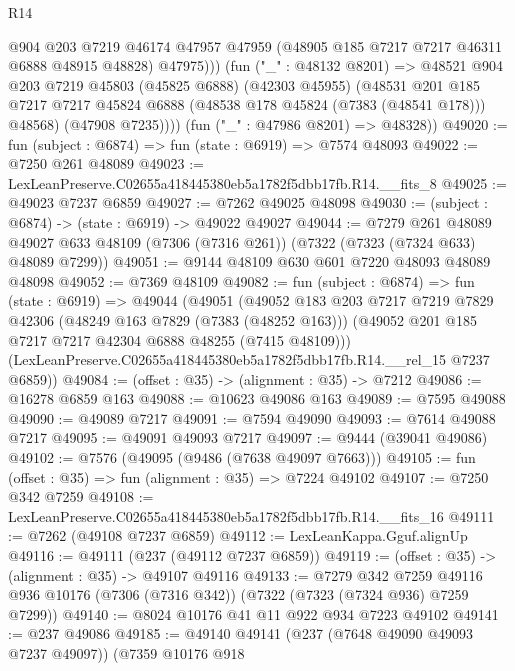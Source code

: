 \begin{lexlean}{R14}
\begin{coremodule}
                @904
                @203
                @7219
                @46174
                @47957
                @47959
                (@48905 @185 @7217 @7217 @46311 @6888 @48915 @48828)
                @47975)))
          (fun ("_" : @48132 @8201) =>
          @48521
            @904
            @203
            @7219
            @45803
            (@45825 @6888)
            (@42303 @45955)
            (@48531
              @201
              @185
              @7217
              @7217
              @45824
              @6888
              (@48538 @178 @45824 (@7383 (@48541 @178)))
              @48568)
            (@47908 @7235))))
      (fun ("_" : @47986 @8201) => @48328))
@49020 := fun (subject : @6874) => fun (state : @6919) => @7574 @48093
@49022 := @7250 @261 @48089
@49023 := LexLeanPreserve.C02655a418445380eb5a1782f5dbb17fb.R14.__fits_8
@49025 := @49023 @7237 @6859
@49027 := @7262 @49025 @48098
@49030 := (subject : @6874) -> (state : @6919) -> @49022 @49027
@49044 := @7279
    @261
    @48089
    @49027
    @633
    @48109
    (@7306 (@7316 @261))
    (@7322 (@7323 (@7324 @633) @48089 @7299))
@49051 := @9144 @48109 @630 @601 @7220 @48093 @48089 @48098
@49052 := @7369 @48109
@49082 := fun (subject : @6874) =>
  fun (state : @6919) =>
  @49044
    (@49051
      (@49052
        @183
        @203
        @7217
        @7219
        @7829
        @42306
        (@48249 @163 @7829 (@7383 (@48252 @163)))
        (@49052 @201 @185 @7217 @7217 @42304 @6888 @48255 (@7415 @48109)))
      (LexLeanPreserve.C02655a418445380eb5a1782f5dbb17fb.R14.__rel_15 @7237 @6859))
@49084 := (offset : @35) -> (alignment : @35) -> @7212
@49086 := @16278 @6859 @163
@49088 := @10623 @49086 @163
@49089 := @7595 @49088
@49090 := @49089 @7217
@49091 := @7594 @49090
@49093 := @7614 @49088 @7217
@49095 := @49091 @49093 @7217
@49097 := @9444 (@39041 @49086)
@49102 := @7576 (@49095 (@9486 (@7638 @49097 @7663)))
@49105 := fun (offset : @35) => fun (alignment : @35) => @7224 @49102
@49107 := @7250 @342 @7259
@49108 := LexLeanPreserve.C02655a418445380eb5a1782f5dbb17fb.R14.__fits_16
@49111 := @7262 (@49108 @7237 @6859)
@49112 := LexLeanKappa.Gguf.alignUp
@49116 := @49111 (@237 (@49112 @7237 @6859))
@49119 := (offset : @35) -> (alignment : @35) -> @49107 @49116
@49133 := @7279
    @342
    @7259
    @49116
    @936
    @10176
    (@7306 (@7316 @342))
    (@7322 (@7323 (@7324 @936) @7259 @7299))
@49140 := @8024 @10176 @41 @11 @922 @934 @7223 @49102
@49141 := @237 @49086
@49185 := @49140
    @49141
    (@237 (@7648 @49090 @49093 @7237 @49097))
    (@7359
      @10176
      @918

\end{coremodule}
\end{lexlean}
